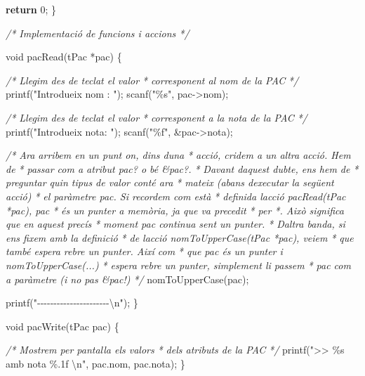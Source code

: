 \documentclass[]{book}
\newenvironment{Shaded}{\begin{snugshade}}{\end{snugshade}}
\newcommand{\CommentTok}[1]{\textcolor[rgb]{0.56,0.35,0.01}{\textit{#1}}}
\newcommand{\ControlFlowTok}[1]{\textcolor[rgb]{0.13,0.29,0.53}{\textbf{#1}}}
\newcommand{\DataTypeTok}[1]{\textcolor[rgb]{0.13,0.29,0.53}{#1}}
\newcommand{\DecValTok}[1]{\textcolor[rgb]{0.00,0.00,0.81}{#1}}
\newcommand{\NormalTok}[1]{#1}
\newcommand{\SpecialCharTok}[1]{\textcolor[rgb]{0.00,0.00,0.00}{#1}}
\newcommand{\StringTok}[1]{\textcolor[rgb]{0.31,0.60,0.02}{#1}}
\begin{document}
\begin{Shaded}
\begin{Highlighting}[]
    \ControlFlowTok{return} \DecValTok{0}\NormalTok{;}
\NormalTok{\}}

\CommentTok{/* Implementació de funcions i accions */}

\DataTypeTok{void}\NormalTok{ pacRead(tPac *pac) \{}

    \CommentTok{/* Llegim des de teclat el valor}
\CommentTok{     * corresponent al nom de la PAC}
\CommentTok{     */}
\NormalTok{    printf(}\StringTok{"Introdueix nom : "}\NormalTok{);}
\NormalTok{    scanf(}\StringTok{"\%s"}\NormalTok{, pac{-}\textgreater{}nom);}

    \CommentTok{/* Llegim des de teclat el valor}
\CommentTok{     * corresponent a la nota de la PAC}
\CommentTok{     */}
\NormalTok{    printf(}\StringTok{"Introdueix nota: "}\NormalTok{);}
\NormalTok{    scanf(}\StringTok{"\%f"}\NormalTok{, \&pac{-}\textgreater{}nota);}
    
    \CommentTok{/* Ara arribem en un punt on, dins d\textquotesingle{}una}
\CommentTok{     * acció, cridem a un altra acció. Hem de }
\CommentTok{     * passar com a atribut pac? o bé \&pac?. }
\CommentTok{     * Davant d\textquotesingle{}aquest dubte, ens hem de }
\CommentTok{     * preguntar quin tipus de valor conté ara}
\CommentTok{     * mateix (abans d\textquotesingle{}executar la següent acció)}
\CommentTok{     * el paràmetre pac. Si recordem com està }
\CommentTok{     * definida l\textquotesingle{}acció pacRead(tPac *pac), pac}
\CommentTok{     * és un punter a memòria, ja que va precedit}
\CommentTok{     * per *. Això significa que en aquest precís}
\CommentTok{     * moment pac continua sent un punter.}
\CommentTok{     * D\textquotesingle{}altra banda, si ens fixem amb la definició}
\CommentTok{     * de l\textquotesingle{}acció nomToUpperCase(tPac *pac), veiem}
\CommentTok{     * que també espera rebre un punter. Així com }
\CommentTok{     * que pac és un punter i nomToUpperCase(...)}
\CommentTok{     * espera rebre un punter, simplement li passem}
\CommentTok{     * pac com a paràmetre (i no pas \&pac!)}
\CommentTok{     */}
\NormalTok{    nomToUpperCase(pac);}
    
\NormalTok{    printf(}\StringTok{"{-}{-}{-}{-}{-}{-}{-}{-}{-}{-}{-}{-}{-}{-}{-}{-}{-}{-}{-}{-}{-}{-}}\SpecialCharTok{\textbackslash{}n}\StringTok{"}\NormalTok{);}
\NormalTok{\}}

\DataTypeTok{void}\NormalTok{ pacWrite(tPac pac) \{}

    \CommentTok{/* Mostrem per pantalla els valors}
\CommentTok{     * dels atributs de la PAC}
\CommentTok{     */}
\NormalTok{    printf(}\StringTok{"\textgreater{}\textgreater{} \%s amb nota \%.1f }\SpecialCharTok{\textbackslash{}n}\StringTok{"}\NormalTok{, pac.nom, pac.nota);}
\NormalTok{\}}


\end{Highlighting}
\end{Shaded}
\end{document}
